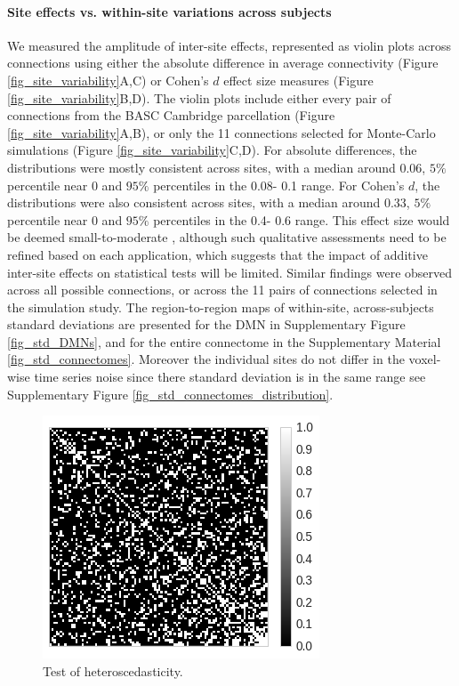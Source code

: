 \documentclass[authoryear]{elsarticle}
\begin{document}
\paragraph{Site effects vs. within-site variations across subjects} We measured the amplitude of inter-site effects, represented as violin plots across connections using either the absolute difference in average connectivity (Figure \ref{fig_site_variability}A,C) or Cohen's $d$ effect size measures (Figure \ref{fig_site_variability}B,D). The violin plots include either every pair of connections from the BASC Cambridge parcellation (Figure \ref{fig_site_variability}A,B), or only the 11 connections selected for Monte-Carlo
simulations (Figure \ref{fig_site_variability}C,D). For absolute differences, the distributions were mostly consistent across sites, with a
median around 0.06, $5\%$ percentile near 0 and $95\%$ percentiles in the 0.08-
0.1 range. For Cohen's $d$, the distributions were also consistent across sites, with a
median around 0.33, $5\%$ percentile near 0 and $95\%$ percentiles in the 0.4-
0.6 range. This effect size would be deemed small-to-moderate \citep{Cohen1992}, although such qualitative assessments need to be refined based on each application, which suggests that the impact of additive inter-site effects on statistical tests will be limited. Similar findings were observed across all possible connections, or across the 11 pairs of
connections selected in the simulation study. The region-to-region maps of within-site, across-subjects standard
deviations are presented for the DMN in Supplementary Figure \ref{fig_std_DMNs},
and for the entire connectome in the Supplementary Material
\ref{fig_std_connectomes}. Moreover the individual sites do not differ in the voxel-wise time series noise since there standard deviation is in the same range see Supplementary Figure \ref{fig_std_connectomes_distribution}.


\begin{figure}[htbp]
\begin{center}
\includegraphics[width=0.5\linewidth]{../figures/hetero_test.png}
\end{center}
\caption[]{
Test of heteroscedasticity. 
}
\label{fig_hetero}
\end{figure}
\end{document}
